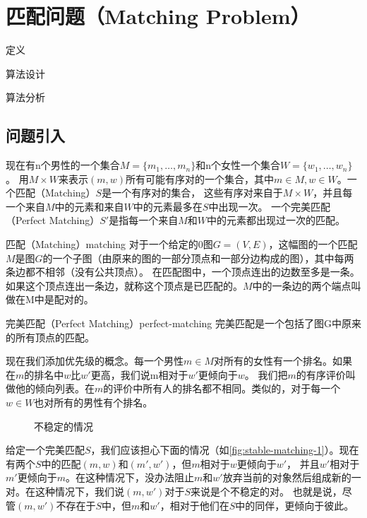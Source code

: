 \chapter{匹配问题（Matching Problem）}

\begin{introduction}
	\item 定义
	\item 算法设计
	\item 算法分析
\end{introduction}

\section{问题引入}\label{sec:stable-matching-def}
现在有n个男性的一个集合$M=\{m_1,\dots,m_n\}$和n个女性一个集合$W=\{w_1,\dots,w_n\}$。
用$M\times W$来表示$(m,w)$所有可能有序对的一个集合，其中$m\in M,w\in W$。一个匹配（Matching）$S$是一个有序对的集合，
这些有序对来自于$M\times W$，并且每一个来自$M$中的元素和来自$W$中的元素最多在$S$中出现一次。
一个完美匹配（Perfect Matching）$S'$是指每一个来自$M$和$W$中的元素都出现过一次的匹配。
\begin{definition}{匹配（Matching）}{matching}
	对于一个给定的0图$G=(V,E)$，这幅图的一个匹配$M$是图$G$的一个子图（由原来的图的一部分顶点和一部分边构成的图），其中每两条边都不相邻（没有公共顶点）。
	在匹配图中，一个顶点连出的边数至多是一条。如果这个顶点连出一条边，就称这个顶点是已匹配的。$M$中的一条边的两个端点叫做在M中是配对的。
\end{definition}
\begin{definition}{完美匹配（Perfect Matching）}{perfect-matching}
	完美匹配是一个包括了图G中原来的所有顶点的匹配。
\end{definition}
现在我们添加优先级的概念。每一个男性$m\in M$对所有的女性有一个排名。如果在$m$的排名中$w$比$w'$更高，我们说m相对于$w'$更倾向于$w$。
我们把$m$的有序评价叫做他的倾向列表。在$m$的评价中所有人的排名都不相同。类似的，对于每一个$w\in W$也对所有的男性有个排名。

\begin{wrapfigure}[10]{r}{0.25\linewidth}
	\centering
	\caption{不稳定的情况}
	\label{fig:stable-matching-1}
\end{wrapfigure}
给定一个完美匹配$S$，我们应该担心下面的情况（如\autoref{fig:stable-matching-1}）。现在有两个$S$中的匹配$(m,w)$和$(m',w')$，但$m$相对于$w$更倾向于$w'$，
并且$w'$相对于$m'$更倾向于$m$。在这种情况下，没办法阻止$m$和$w'$放弃当前的对象然后组成新的一对。在这种情况下，我们说$(m,w')$对于$S$来说是个不稳定的对。
也就是说，尽管$(m,w')$不存在于$S$中，但$m$和$w'$，相对于他们在$S$中的同伴，更倾向于彼此。

